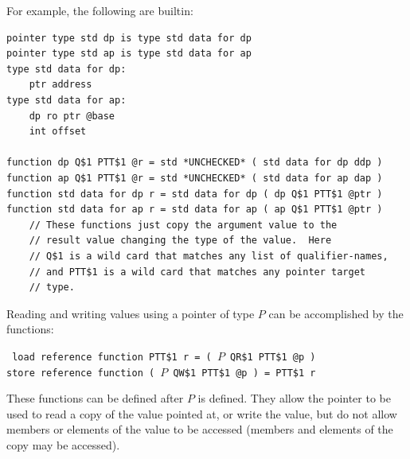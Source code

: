\documentclass[12pt]{article}
\newenvironment{indpar}[1][0.3in]%
	{\begin{list}{}%
		     {\setlength{\itemsep}{0in}%
		      \setlength{\topsep}{0in}%
		      \setlength{\parsep}{1ex}%
		      \setlength{\labelwidth}{#1}%
		      \setlength{\leftmargin}{#1}%
		      \addtolength{\leftmargin}{\labelsep}}%
	 \item}%
	{\end{list}}
\begin{document}
For example, the following are builtin:

\begin{indpar}\begin{verbatim}
pointer type std dp is type std data for dp
pointer type std ap is type std data for ap
type std data for dp:
    ptr address
type std data for ap:
    dp ro ptr @base
    int offset

function dp Q$1 PTT$1 @r = std *UNCHECKED* ( std data for dp ddp )
function ap Q$1 PTT$1 @r = std *UNCHECKED* ( std data for ap dap )
function std data for dp r = std data for dp ( dp Q$1 PTT$1 @ptr )
function std data for ap r = std data for ap ( ap Q$1 PTT$1 @ptr )
    // These functions just copy the argument value to the
    // result value changing the type of the value.  Here
    // Q$1 is a wild card that matches any list of qualifier-names,
    // and PTT$1 is a wild card that matches any pointer target
    // type.
\end{verbatim}\end{indpar}

Reading and writing values using a pointer of type $P$
can be accomplished by the functions:

\begin{indpar}[1ex] \tt
load reference function PTT\$1 r = ( $P$ QR\$1 PTT\$1 @p ) \\
store reference function ( $P$ QW\$1 PTT\$1 @p ) = PTT\$1 r
\end{indpar}

These functions can be defined after $P$ is defined.
They allow the pointer to be used to read a copy of the
value pointed at, or write the value, but do not allow
members or elements of the value to be accessed
(members and elements of the copy may be accessed).
\end{document}
